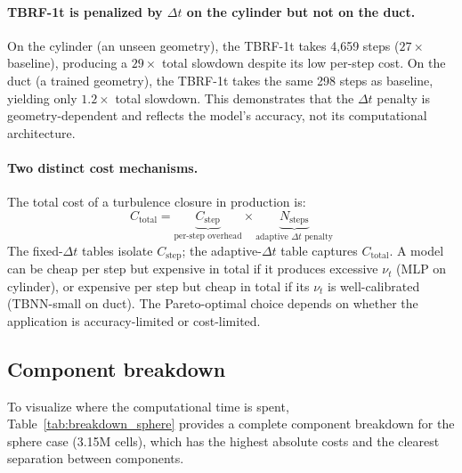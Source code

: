 \paragraph{TBRF-1t is penalized by $\Delta t$ on the cylinder but not on the duct.}
On the cylinder (an unseen geometry), the TBRF-1t takes 4{,}659 steps ($27\times$ baseline), producing a $29\times$ total slowdown despite its low per-step cost.
On the duct (a trained geometry), the TBRF-1t takes the same 298 steps as baseline, yielding only $1.2\times$ total slowdown.
This demonstrates that the $\Delta t$ penalty is geometry-dependent and reflects the model's accuracy, not its computational architecture.

\paragraph{Two distinct cost mechanisms.}
The total cost of a turbulence closure in production is:
\begin{equation}
    C_\mathrm{total} = \underbrace{C_\mathrm{step}}_{\text{per-step overhead}} \times \underbrace{N_\mathrm{steps}}_{\text{adaptive } \Delta t \text{ penalty}}
\end{equation}
The fixed-$\Delta t$ tables isolate $C_\mathrm{step}$; the adaptive-$\Delta t$ table captures $C_\mathrm{total}$.
A model can be cheap per step but expensive in total if it produces excessive $\nu_t$ (MLP on cylinder), or expensive per step but cheap in total if its $\nu_t$ is well-calibrated (TBNN-small on duct).
The Pareto-optimal choice depends on whether the application is accuracy-limited or cost-limited.

\subsection{Component breakdown}
\label{sec:cost:breakdown}

To visualize where the computational time is spent, Table~\ref{tab:breakdown_sphere} provides a complete component breakdown for the sphere case (3.15M cells), which has the highest absolute costs and the clearest separation between components.

